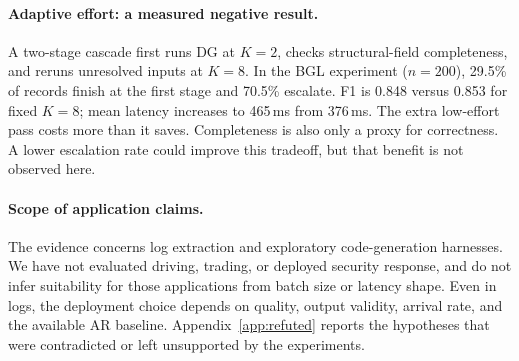 \paragraph{Adaptive effort: a measured negative result.}
A two-stage cascade first runs DG at $K{=}2$, checks structural-field
completeness, and reruns unresolved inputs at $K{=}8$. In the BGL
experiment ($n{=}200$), 29.5\% of records finish at the first stage
and 70.5\% escalate. F1 is 0.848 versus 0.853 for fixed $K{=}8$;
mean latency increases to 465\,ms from 376\,ms. The extra low-effort
pass costs more than it saves. Completeness is also only a proxy for
correctness. A lower escalation rate could improve this tradeoff, but
that benefit is not observed here.

\paragraph{Scope of application claims.}
The evidence concerns log extraction and exploratory code-generation
harnesses. We have not evaluated driving, trading, or deployed security
response, and do not infer suitability for those applications from
batch size or latency shape. Even in logs, the deployment choice depends
on quality, output validity, arrival rate, and the available AR baseline.
Appendix~\ref{app:refuted} reports the hypotheses that were contradicted
or left unsupported by the experiments.
